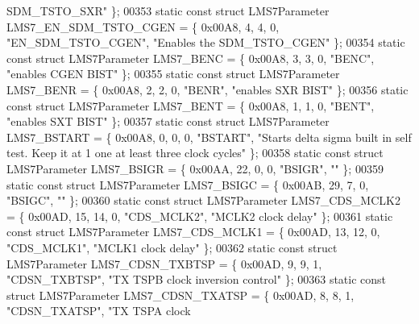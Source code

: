 \begin{DoxyCode}
{       SDM\_TSTO\_SXR"} \};
00353 \textcolor{keyword}{static} \textcolor{keyword}{const} \textcolor{keyword}{struct }LMS7Parameter LMS7_EN_SDM_TSTO_CGEN = \{ 0x00A8, 4, 4, 0, \textcolor{stringliteral}{"EN\_SDM\_TSTO\_CGEN"}, \textcolor{stringliteral}{"Enables
       the SDM\_TSTO\_CGEN"} \};
00354 \textcolor{keyword}{static} \textcolor{keyword}{const} \textcolor{keyword}{struct }LMS7Parameter LMS7_BENC = \{ 0x00A8, 3, 3, 0, \textcolor{stringliteral}{"BENC"}, \textcolor{stringliteral}{"enables CGEN BIST"} \};
00355 \textcolor{keyword}{static} \textcolor{keyword}{const} \textcolor{keyword}{struct }LMS7Parameter LMS7_BENR = \{ 0x00A8, 2, 2, 0, \textcolor{stringliteral}{"BENR"}, \textcolor{stringliteral}{"enables SXR BIST"} \};
00356 \textcolor{keyword}{static} \textcolor{keyword}{const} \textcolor{keyword}{struct }LMS7Parameter LMS7_BENT = \{ 0x00A8, 1, 1, 0, \textcolor{stringliteral}{"BENT"}, \textcolor{stringliteral}{"enables SXT BIST"} \};
00357 \textcolor{keyword}{static} \textcolor{keyword}{const} \textcolor{keyword}{struct }LMS7Parameter LMS7_BSTART = \{ 0x00A8, 0, 0, 0, \textcolor{stringliteral}{"BSTART"}, \textcolor{stringliteral}{"Starts delta sigma built in
       self test. Keep it at 1 one at least three clock cycles"} \};
00358 \textcolor{keyword}{static} \textcolor{keyword}{const} \textcolor{keyword}{struct }LMS7Parameter LMS7_BSIGR = \{ 0x00AA, 22, 0, 0, \textcolor{stringliteral}{"BSIGR"}, \textcolor{stringliteral}{""} \};
00359 \textcolor{keyword}{static} \textcolor{keyword}{const} \textcolor{keyword}{struct }LMS7Parameter LMS7_BSIGC = \{ 0x00AB, 29, 7, 0, \textcolor{stringliteral}{"BSIGC"}, \textcolor{stringliteral}{""} \};
00360 \textcolor{keyword}{static} \textcolor{keyword}{const} \textcolor{keyword}{struct }LMS7Parameter LMS7_CDS_MCLK2 = \{ 0x00AD, 15, 14, 0, \textcolor{stringliteral}{"CDS\_MCLK2"}, \textcolor{stringliteral}{"MCLK2 clock delay"} \};
00361 \textcolor{keyword}{static} \textcolor{keyword}{const} \textcolor{keyword}{struct }LMS7Parameter LMS7_CDS_MCLK1 = \{ 0x00AD, 13, 12, 0, \textcolor{stringliteral}{"CDS\_MCLK1"}, \textcolor{stringliteral}{"MCLK1 clock delay"} \};
00362 \textcolor{keyword}{static} \textcolor{keyword}{const} \textcolor{keyword}{struct }LMS7Parameter LMS7_CDSN_TXBTSP = \{ 0x00AD, 9, 9, 1, \textcolor{stringliteral}{"CDSN\_TXBTSP"}, \textcolor{stringliteral}{"TX TSPB clock
       inversion control"} \};
00363 \textcolor{keyword}{static} \textcolor{keyword}{const} \textcolor{keyword}{struct }LMS7Parameter LMS7_CDSN_TXATSP = \{ 0x00AD, 8, 8, 1, \textcolor{stringliteral}{"CDSN\_TXATSP"}, \textcolor{stringliteral}{"TX TSPA clock
}
\end{DoxyCode}

